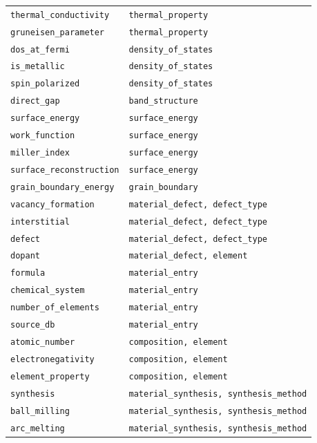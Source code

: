 \begin{footnotesize}
\begin{longtable}{ll}
    \texttt{thermal\_conductivity} & \texttt{thermal\_property} \\
    \texttt{gruneisen\_parameter} & \texttt{thermal\_property} \\
    \texttt{dos\_at\_fermi} & \texttt{density\_of\_states} \\
    \texttt{is\_metallic} & \texttt{density\_of\_states} \\
    \texttt{spin\_polarized} & \texttt{density\_of\_states} \\
    \texttt{direct\_gap} & \texttt{band\_structure} \\
    \texttt{surface\_energy} & \texttt{surface\_energy} \\
    \texttt{work\_function} & \texttt{surface\_energy} \\
    \texttt{miller\_index} & \texttt{surface\_energy} \\
    \texttt{surface\_reconstruction} & \texttt{surface\_energy} \\
    \texttt{grain\_boundary\_energy} & \texttt{grain\_boundary} \\
    \texttt{vacancy\_formation} & \texttt{material\_defect, defect\_type} \\
    \texttt{interstitial} & \texttt{material\_defect, defect\_type} \\
    \texttt{defect} & \texttt{material\_defect, defect\_type} \\
    \texttt{dopant} & \texttt{material\_defect, element} \\
    \texttt{formula} & \texttt{material\_entry} \\
    \texttt{chemical\_system} & \texttt{material\_entry} \\
    \texttt{number\_of\_elements} & \texttt{material\_entry} \\
    \texttt{source\_db} & \texttt{material\_entry} \\
    \texttt{atomic\_number} & \texttt{composition, element} \\
    \texttt{electronegativity} & \texttt{composition, element} \\
    \texttt{element\_property} & \texttt{composition, element} \\
    \texttt{synthesis} & \texttt{material\_synthesis, synthesis\_method} \\
    \texttt{ball\_milling} & \texttt{material\_synthesis, synthesis\_method} \\
    \texttt{arc\_melting} & \texttt{material\_synthesis, synthesis\_method} \\

\end{longtable}
\end{footnotesize}

